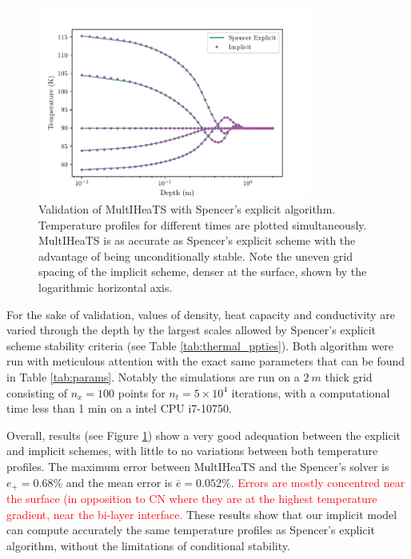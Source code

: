 \documentclass[]{interact}
\theoremstyle{plain}%
\theoremstyle{definition}
\theoremstyle{remark}
\begin{document}
\begin{figure}[htpb]
	\centering
	\includegraphics[width=0.8\textwidth]{figures/valid_spencer.pdf}
	\caption{Validation of MultIHeaTS with Spencer's explicit algorithm. Temperature profiles for different times are plotted simultaneously. MultIHeaTS is as accurate as Spencer's explicit scheme with the advantage of being unconditionally stable. 
    Note the uneven grid spacing of the implicit scheme, denser at the surface, shown by the logarithmic horizontal axis.
    }
    \label{fig:val_spencer}
\end{figure}

For the sake of validation, values of density, heat capacity and conductivity are varied through the depth by the largest scales allowed by Spencer's explicit scheme stability criteria (see Table \ref{tab:thermal_ppties}).
Both algorithm were run with meticulous attention with the exact same parameters that can be found in Table \ref{tab:params}. Notably the simulations are run on a $\SI{2}{m}$ thick grid consisting of $n_x=100$ points for $n_t = 5 \times 10^4 $ iterations, with a computational time less than 1 min on a intel CPU i7-10750.

Overall, results (see Figure \ref{fig:val_spencer}) show  a very good adequation between the explicit and implicit schemes, with little to no variations between both temperature profiles. 
The maximum error  between MultIHeaTS and the Spencer's solver is $e_+=0.68\%$ and the mean error is $\overline{e}=0.052\%$.
\textcolor{red}{Errors are mostly concentred near the surface (in opposition to CN where they are at the highest temperature gradient, near the bi-layer interface.}
These results show that our implicit model can compute accurately the same temperature profiles as Spencer's explicit algorithm, without the limitations of conditional stability.
\end{document}
